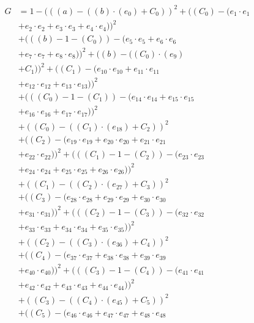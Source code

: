 \documentclass[10pt, a4paper]{article}
\begin{document}
\begin{small}
\begin{align*}
G &= 1 - (((a) - ((b)  \cdot  (e_{0}) + C_{0}))^{2} + ((C_{0}) - (e_{1} \cdot e_{1} \\
& + e_{2} \cdot e_{2} + e_{3} \cdot e_{3} + e_{4} \cdot e_{4}))^{2} \\
& + (((b) - 1 - (C_{0})) - (e_{5} \cdot e_{5} + e_{6} \cdot e_{6} \\
& + e_{7} \cdot e_{7} + e_{8} \cdot e_{8}))^{2} + ((b) - ((C_{0})  \cdot  (e_{9}) \\
& + C_{1}))^{2} + ((C_{1}) - (e_{10} \cdot e_{10} + e_{11} \cdot e_{11} \\
& + e_{12} \cdot e_{12} + e_{13} \cdot e_{13}))^{2} \\
& + (((C_{0}) - 1 - (C_{1})) - (e_{14} \cdot e_{14} + e_{15} \cdot e_{15} \\
& + e_{16} \cdot e_{16} + e_{17} \cdot e_{17}))^{2} \\
& + ((C_{0}) - ((C_{1})  \cdot  (e_{18}) + C_{2}))^{2} \\
& + ((C_{2}) - (e_{19} \cdot e_{19} + e_{20} \cdot e_{20} + e_{21} \cdot e_{21} \\
& + e_{22} \cdot e_{22}))^{2} + (((C_{1}) - 1 - (C_{2})) - (e_{23} \cdot e_{23} \\
& + e_{24} \cdot e_{24} + e_{25} \cdot e_{25} + e_{26} \cdot e_{26}))^{2} \\
& + ((C_{1}) - ((C_{2})  \cdot  (e_{27}) + C_{3}))^{2} \\
& + ((C_{3}) - (e_{28} \cdot e_{28} + e_{29} \cdot e_{29} + e_{30} \cdot e_{30} \\
& + e_{31} \cdot e_{31}))^{2} + (((C_{2}) - 1 - (C_{3})) - (e_{32} \cdot e_{32} \\
& + e_{33} \cdot e_{33} + e_{34} \cdot e_{34} + e_{35} \cdot e_{35}))^{2} \\
& + ((C_{2}) - ((C_{3})  \cdot  (e_{36}) + C_{4}))^{2} \\
& + ((C_{4}) - (e_{37} \cdot e_{37} + e_{38} \cdot e_{38} + e_{39} \cdot e_{39} \\
& + e_{40} \cdot e_{40}))^{2} + (((C_{3}) - 1 - (C_{4})) - (e_{41} \cdot e_{41} \\
& + e_{42} \cdot e_{42} + e_{43} \cdot e_{43} + e_{44} \cdot e_{44}))^{2} \\
& + ((C_{3}) - ((C_{4})  \cdot  (e_{45}) + C_{5}))^{2} \\
& + ((C_{5}) - (e_{46} \cdot e_{46} + e_{47} \cdot e_{47} + e_{48} \cdot e_{48} \\

\end{align*}
\end{small}
\end{document}
